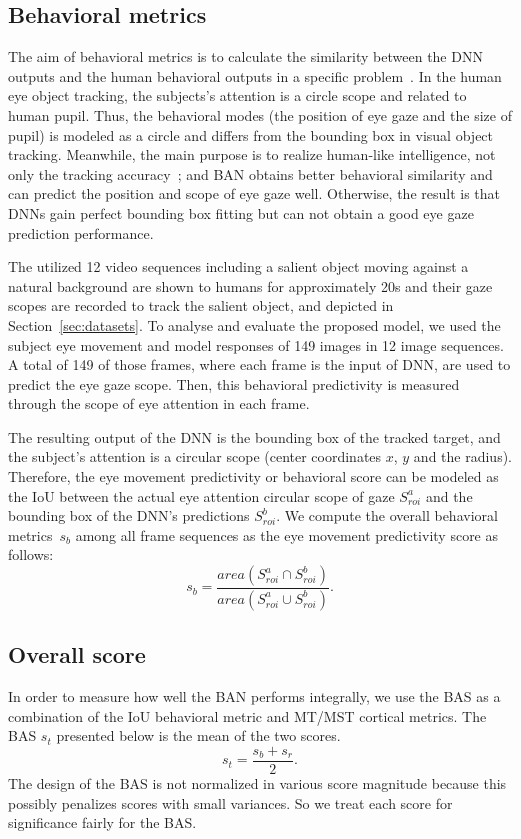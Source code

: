 \documentclass[journal]{IEEEtran}
\begin{document}
\subsection{Behavioral metrics}
The aim of behavioral metrics is to calculate the similarity between the DNN outputs and the human behavioral outputs in a specific problem~\cite{rajalingham2018large}. 
In the human eye object tracking, the subjects's attention is a circle scope and related to human pupil.
Thus, the behavioral modes (the position of eye gaze and the size of pupil) is modeled as a circle and differs from the bounding box in visual object tracking. 
Meanwhile, the main purpose is to realize human-like intelligence, not only the tracking accuracy~\cite{schrimpf2020integrative}; 
and BAN obtains better behavioral similarity and can predict the position and scope of eye gaze well. 
Otherwise, the result is that DNNs gain perfect bounding box fitting but can not obtain a good eye gaze prediction performance. 


The utilized 12 video sequences including a salient object moving against a natural background are shown to humans for approximately 20s 
and their gaze scopes are recorded to track the salient object, and depicted in Section~\ref{sec:datasets}. 
To analyse and evaluate the proposed model, we used the subject eye movement and model responses of 149 images in 12 image sequences.
A total of 149 of those frames, where each frame is the input of DNN, are used to predict the eye gaze scope.
Then, this behavioral predictivity is measured through the scope of eye attention in each frame. 

The resulting output of the DNN is the bounding box of the tracked target, 
and the subject's attention is a circular scope (center coordinates $x$, $y$ and the radius).
Therefore, the eye movement predictivity or behavioral score can be modeled as the IoU between the actual eye attention circular scope of gaze $S_{roi}^a$ and the bounding box of the DNN's predictions $S_{roi}^b$. 
We compute the overall behavioral metrics~$s_b$ among all frame sequences as the eye movement predictivity score as follows: 
\begin{equation}
	s_b=\frac{area(S_{roi}^a \cap S_{roi}^b) }  { area(S_{roi}^a \cup S_{roi}^b) }.
\end{equation}


\subsection{Overall score}
In order to measure how well the BAN performs integrally, we use the BAS as a combination of the IoU behavioral metric and MT/MST cortical metrics.
The BAS $s_{t}$ presented below is the mean of the two scores. 
\begin{equation} \label{equ:score_btn}
	s_{t} = \frac{s_b + s_r}{2}.
\end{equation}
The design of the BAS is not normalized in various score magnitude because this possibly penalizes scores with small variances.
So we treat each score for significance fairly for the BAS. 
\end{document}

